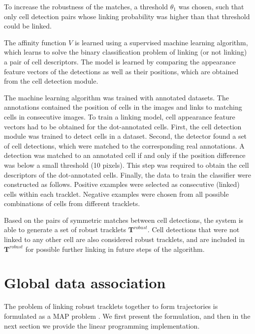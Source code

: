 		To increase the robustness of the matches, a threshold $\theta_1$ was chosen, such that only cell detection pairs whose linking probability was higher than that threshold could be linked.
		
		The affinity function $V$ is learned using a supervised machine learning algorithm, which learns to solve the binary classification problem of linking (or not linking) a pair of cell descriptors. The model is learned by comparing the appearance feature vectors of the detections as well as their positions, which are obtained from the cell detection module.

		
		The machine learning algorithm was trained with annotated datasets. The annotations contained the position of cells in the images and links to matching cells in consecutive images. To train a linking model, cell appearance feature vectors had to be obtained for the dot-annotated cells. First, the cell detection module was trained to detect cells in a dataset. Second, the detector found a set of cell detections, which were matched to the corresponding real annotations. A detection was matched to an annotated cell if and only if the position difference was below a small threshold (10 pixels). This step was required to obtain the cell descriptors of the dot-annotated cells. Finally, the data to train the classifier were constructed as follows. Positive examples were selected as consecutive (linked) cells within each tracklet. Negative examples were chosen from all possible combinations of cells from different tracklets.
		

		Based on the pairs of symmetric matches between cell detections, the system is able to generate a set of robust tracklets $\textbf{T}^{robust}$. Cell detections that were not linked to any other cell are also considered robust tracklets, and are included in $\textbf{T}^{robust}$ for possible further linking in future steps of the algorithm.
		
	\section{Global data association \statusfirstdraft}
		\label{sec:globaldataassoc}
		The problem of linking robust tracklets together to form trajectories is formulated as a MAP problem \cite{bise11global} \cite{zhang08} \cite{huang08}. We first present the formulation, and then in the next section we provide the linear programming implementation.
		
